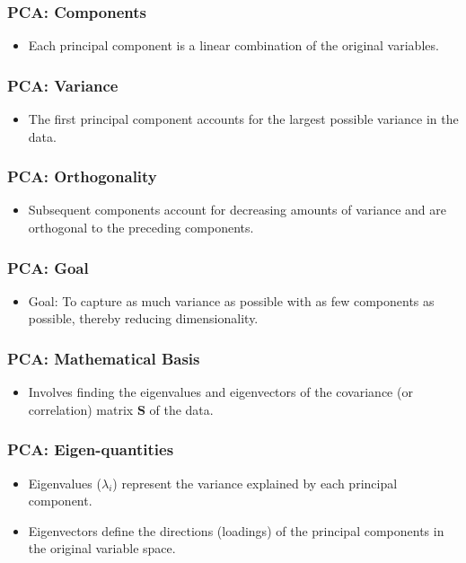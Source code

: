 \documentclass{beamer}
\begin{document}
\begin{frame}
    \frametitle{PCA: Components}
    \begin{itemize}
        \item Each principal component is a linear combination of the original variables.
    \end{itemize}
\end{frame}

\begin{frame}
    \frametitle{PCA: Variance}
    \begin{itemize}
        \item The first principal component accounts for the largest possible variance in the data.
    \end{itemize}
\end{frame}

\begin{frame}
    \frametitle{PCA: Orthogonality}
    \begin{itemize}
        \item Subsequent components account for decreasing amounts of variance and are \alert{orthogonal} to the preceding components.
    \end{itemize}
\end{frame}

\begin{frame}
    \frametitle{PCA: Goal}
    \begin{itemize}
        \item Goal: To capture as much variance as possible with as few components as possible, thereby reducing dimensionality.
    \end{itemize}
\end{frame}

\begin{frame}
    \frametitle{PCA: Mathematical Basis}
    \begin{itemize}
        \item Involves finding the \alert{eigenvalues} and \alert{eigenvectors} of the covariance (or correlation) matrix $\mathbf{S}$ of the data.
    \end{itemize}
\end{frame}

\begin{frame}
    \frametitle{PCA: Eigen-quantities}
    \begin{itemize}
        \item Eigenvalues ($\lambda_i$) represent the variance explained by each principal component.
        \item Eigenvectors define the directions (loadings) of the principal components in the original variable space.
    \end{itemize}
\end{frame}
\end{document}
